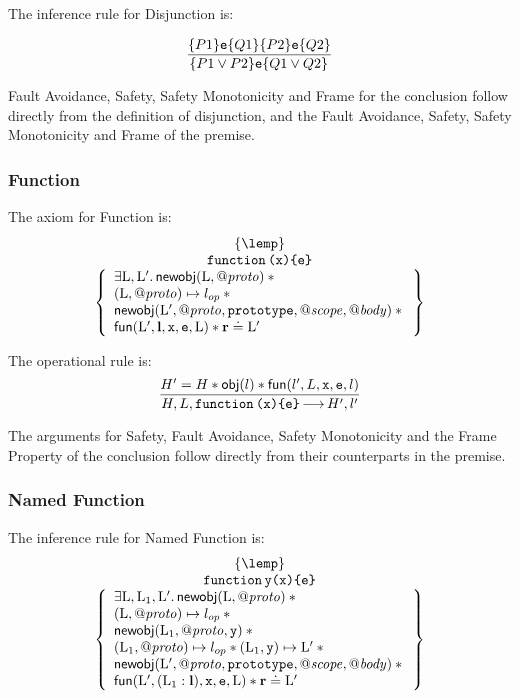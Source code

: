 \documentclass{article}
\begin{document}
The inference rule for Disjunction is:

\[\frac{\{P1\}\mbox{\texttt{{\upshape e}}}\{Q1\}\\
\{P2\}\mbox{\texttt{{\upshape e}}}\{Q2\}\\}
{ \{P1\lor P2\}\mbox{\texttt{{\upshape e}}}\{Q1\lor Q2\}\\}\]

Fault Avoidance, Safety, Safety Monotonicity and Frame for the conclusion follow directly from the definition of disjunction, and the Fault Avoidance, Safety, Safety Monotonicity and Frame of the premise.

\subsubsection{Function}

The axiom for Function is:
\[
\begin{array}{c}
\{ \lemp \}\\
\jsfun{x}{e}\\
\left\{\begin{array}{l}
        \exists \V{L},\V{L}'\st
        \newobj(\V{L},\protop) \sep {}\\
        (\V{L},\protop)\pointsto\lop \sep {}\\
        \newobj(\V{L}',\protop,\js{prototype},\scopep, \bodyp) \sep {}\\
        \func(\V{L}',\ls,\js{x},\js{e},\V{L}) \sep \rv \doteq \V{L}'
\end{array}\right\}
\end{array}
\]

The operational rule is:
\[\frac
{H' = H \mathbin{*} \mathsf{obj}(l) \mathbin{*} \mathsf{fun}(l',L,\mbox{\texttt{{\upshape x}}},\mbox{\texttt{{\upshape e}}},l)}
{H,L,\mbox{\texttt{{\upshape function\,(x)\{e\}}}} {\,\longrightarrow\,} H',l'}
\]

The arguments for Safety, Fault Avoidance, Safety Monotonicity and the Frame Property of the conclusion follow directly from their counterparts in the premise.

\subsubsection{Named Function}

The inference rule for Named Function is:
\[
\begin{array}{c}
\{\lemp\}\\
\jsfun[y]{x}{e}\\
\left\{ \begin{array}{l}
        \exists \V{L},\V{L}_1,\V{L}' \st
        \newobj(\V{L},\protop) \sep {}\\
        (\V{L},\protop)\pointsto\lop \sep {}\\
        \newobj(\V{L}_1,\protop,\js{y}) \sep {}\\
        (\V{L}_1,\protop)\pointsto\lop \sep (\V{L}_1,\js{y})\pointsto \V{L}' \sep {}\\
        \newobj(\V{L}',\protop,\js{prototype},\scopep, \bodyp) \sep {}\\
        \func(\V{L}',(\V{L}_1:\ls),\js{x},\js{e},\V{L}) \sep \rv \doteq \V{L}'
\end{array}\right\}
\end{array}
\]
\end{document}
